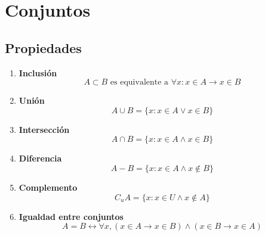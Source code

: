  \section{Conjuntos}
 
 \subsection{Propiedades}
    
            \begin{enumerate}
                \item \textbf{Inclusión}
                    $$ A \subset B \textrm{ es equivalente a } \forall x:  x \in A \to x \in B$$
                \item \textbf{Unión}
                    $$ A \cup B = \{ x: x \in A \vee  x \in B \} $$
                \item \textbf{Intersección}
                    $$ A \cap B = \{ x: x \in A \wedge  x \in B \}  $$
                \item \textbf{Diferencia}
                    $$ A - B = \{ x: x \in A \wedge  x \notin B \} $$
                \item \textbf{Complemento}
                    $$ C_{u} A = \{ x: x \in U \wedge  x \notin A \} $$
                \item \textbf{Igualdad entre conjuntos}
                    $$ A = B  \leftrightarrow \forall x, (x \in A \to x \in B) \wedge (x \in B \to x \in A) $$
            \end{enumerate}